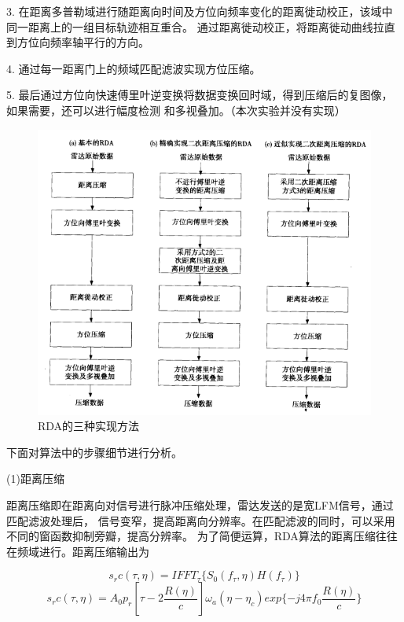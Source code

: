 \documentclass{article}
\begin{document}
3. 在距离多普勒域进行随距离向时间及方位向频率变化的距离徙动校正，该域中同一距离上的一组目标轨迹相互重合。
通过距离徙动校正，将距离徙动曲线拉直到方位向频率轴平行的方向。

4. 通过每一距离门上的频域匹配滤波实现方位压缩。

5. 最后通过方位向快速傅里叶逆变换将数据变换回时域，得到压缩后的复图像，如果需要，还可以进行幅度检测
和多视叠加。（本次实验并没有实现）

\begin{figure}[H] %
\centering
\includegraphics[scale=0.6]{1.png}
\caption{RDA的三种实现方法}
\label{1}
\end{figure}

下面对算法中的步骤细节进行分析。

(1)距离压缩

距离压缩即在距离向对信号进行脉冲压缩处理，雷达发送的是宽LFM信号，通过匹配滤波处理后，
信号变窄，提高距离向分辨率。在匹配滤波的同时，可以采用不同的窗函数抑制旁瓣，提高分辨率。
为了简便运算，RDA算法的距离压缩往往在频域进行。距离压缩输出为

\begin{equation}
	s_rc( \tau, \eta ) = IFFT_{\tau} \{ S_0(f_{ \tau}, \eta) H(f_{\tau}) \}
\end{equation}
\begin{equation}
	s_rc( \tau, \eta ) = A_0 p_r [\tau - 2\frac{R(\eta)}{c}] \omega_a (\eta - \eta_{c}) exp \{ -j4 \pi f_0 \frac{R(\eta)}{c} \}
\end{equation}
\end{document}
